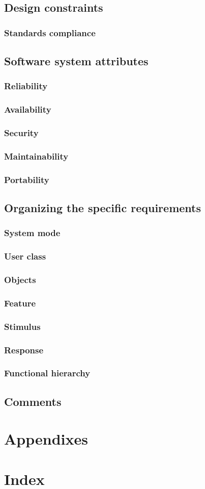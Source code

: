 \documentclass[draftclsnofoot,onecolumn,letterpaper,10pt,compsoc]{IEEEtran}
\begin{document}
	\subsection{Design constraints}
		\subsubsection{Standards compliance}
	\subsection{Software system attributes}
		\subsubsection{Reliability}
		\subsubsection{Availability}
		\subsubsection{Security}
		\subsubsection{Maintainability}
		\subsubsection{Portability}
	\subsection{Organizing the specific requirements}
		\subsubsection{System mode}
		\subsubsection{User class}
		\subsubsection{Objects}
		\subsubsection{Feature}
		\subsubsection{Stimulus}
		\subsubsection{Response}
		\subsubsection{Functional hierarchy}
	\subsection{Comments}
\section{Appendixes}
\section{Index}
\end{document}

